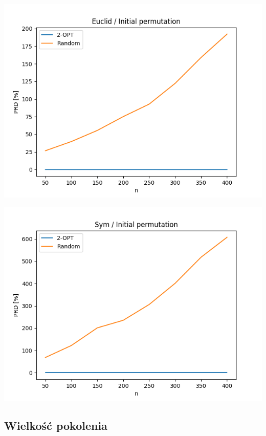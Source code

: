 \documentclass{article}
\begin{document}
\begin{center}
\includegraphics[width=\textwidth, 
                   height = 0.4\textheight, 
                   keepaspectratio]
                  {plots/euclid_2_gen_rand} 
\end{center}

\begin{center}
\includegraphics[width=\textwidth, 
                   height = 0.4\textheight, 
                   keepaspectratio]
                  {plots/sym_2_gen_rand} 
\end{center}


\subsection{Wielkość pokolenia}
\end{document}
